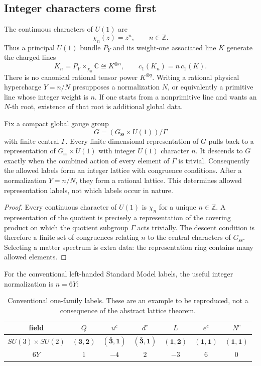 \documentclass[11pt]{article}
\newcommand{\Z}{\mathbb{Z}}
\newcommand{\C}{\mathbb{C}}
\newcommand{\cOne}{c_1}
\begin{document}
\subsection{Integer characters come first}

The continuous characters of \(U(1)\) are
\[
\chi_n(z)=z^n,\qquad n\in\Z.
\]
Thus a principal \(U(1)\) bundle \(P_Y\) and its weight-one associated line
\(K\) generate the charged lines
\[
K_n=P_Y\times_{\chi_n}\C\cong K^{\otimes n},
\qquad
\cOne(K_n)=n\,\cOne(K).
\]
There is no canonical rational tensor power \(K^{\otimes q}\). Writing a
rational physical hypercharge \(Y=n/N\) presupposes a normalization \(N\),
or equivalently a primitive line whose integer weight is \(n\). If one starts
from a nonprimitive line and wants an \(N\)-th root, existence of that root
is additional global data.

\begin{theorem}\label{thm:charge-lattice}
Fix a compact global gauge group
\[
G=(G_{\mathrm{ss}}\times U(1))/\Gamma
\]
with finite central \(\Gamma\). Every finite-dimensional representation of
\(G\) pulls back to a representation of \(G_{\mathrm{ss}}\times U(1)\) with
integer \(U(1)\) character \(n\). It descends to \(G\) exactly when the
combined action of every element of \(\Gamma\) is trivial. Consequently the
allowed labels form an integer lattice with congruence conditions. After a
normalization \(Y=n/N\), they form a rational lattice. This determines
allowed representation labels, not which labels occur in nature.
\end{theorem}

\begin{proof}
Every continuous character of \(U(1)\) is \(\chi_n\) for a unique
\(n\in\Z\). A representation of the quotient is precisely a representation
of the covering product on which the quotient subgroup \(\Gamma\) acts
trivially. The descent condition is therefore a finite set of congruences
relating \(n\) to the central characters of \(G_{\mathrm{ss}}\). Selecting a
matter spectrum is extra data: the representation ring contains many
allowed elements.
\end{proof}

For the conventional left-handed Standard Model labels, the useful integer
normalization is \(n=6Y\):
\begin{table}[ht]
\centering
\caption{Conventional one-family labels. These are an example to be
reproduced, not a consequence of the abstract lattice theorem.}
\label{tab:sm-labels}
\begin{tabular}{@{}ccccccc@{}}
\toprule
field & \(Q\) & \(u^c\) & \(d^c\) & \(L\) & \(e^c\) & \(N^c\) \\
\midrule
\(SU(3)\times SU(2)\) &
\((\mathbf3,\mathbf2)\) &
\((\bar{\mathbf3},\mathbf1)\) &
\((\bar{\mathbf3},\mathbf1)\) &
\((\mathbf1,\mathbf2)\) &
\((\mathbf1,\mathbf1)\) &
\((\mathbf1,\mathbf1)\) \\
\(6Y\) & \(1\) & \(-4\) & \(2\) & \(-3\) & \(6\) & \(0\) \\
\bottomrule
\end{tabular}
\end{table}
\end{document}
